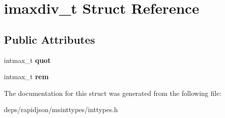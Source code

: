 \hypertarget{structimaxdiv__t}{}\section{imaxdiv\+\_\+t Struct Reference}
\label{structimaxdiv__t}
\subsection*{Public Attributes}
\begin{DoxyCompactItemize}
\item 
intmax\+\_\+t {\bfseries quot}\hypertarget{structimaxdiv__t_a9339814cbb7610c72fb7d30c6573b393}{}\label{structimaxdiv__t_a9339814cbb7610c72fb7d30c6573b393}

\item 
intmax\+\_\+t {\bfseries rem}\hypertarget{structimaxdiv__t_a6c9701ad10bff81edae7ff679cae7850}{}\label{structimaxdiv__t_a6c9701ad10bff81edae7ff679cae7850}

\end{DoxyCompactItemize}


The documentation for this struct was generated from the following file\+:\begin{DoxyCompactItemize}
\item 
deps/rapidjson/msinttypes/inttypes.\+h\end{DoxyCompactItemize}
